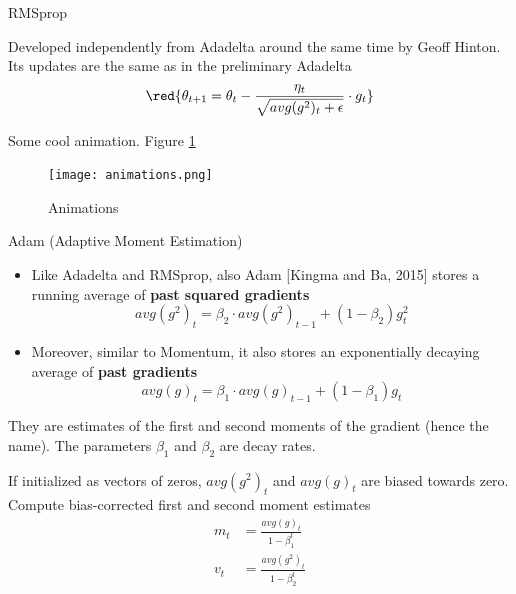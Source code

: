 \documentclass[english]{article}
\begin{document}

\item {RMSprop}

Developed independently from Adadelta around the same time by Geoff Hinton. Its updates are the same as in the preliminary Adadelta
 $$\red{\theta_{t+1} = \theta_t - \frac{\eta_t}{\sqrt{avg(g^2)_t + \epsilon}} \cdot g_t}$$







\item {Some cool animation}. Figure \ref{animations}

\begin{figure}
 \centering
\texttt{[image: animations.png]}
\caption{Animations}
\label{animations}
\end{figure}



\href{https://imgur.com/a/Hqolp}{}









\item {Adam (Adaptive Moment Estimation)}



\begin{itemize}
\item Like Adadelta and RMSprop, also Adam [Kingma and Ba, 2015] stores a running average of \textbf{past squared gradients}
$$avg(g^2)_t = \beta_2 \cdot avg(g^2)_{t-1} + (1-\beta_2) g^2_t$$

\item Moreover, similar to Momentum, it also stores an exponentially decaying average of \textbf{past gradients}
$$avg(g)_t = \beta_1 \cdot avg(g)_{t-1} + (1-\beta_1) g_t$$
\end{itemize}


They are estimates of the first and second moments of the gradient (hence the name). The parameters $\beta_1$ and $\beta_2$ are decay rates.











If initialized as vectors of zeros, $avg(g^2)_t $ and $avg(g)_t$ are biased towards zero. Compute bias-corrected first and second moment estimates
\begin{align*}
m_t &= \frac{avg(g)_t}{1-\beta_1^t} \\
v_t &= \frac{avg(g^2)_t}{1 - \beta_2^t}
\end{align*}  
\end{document}
